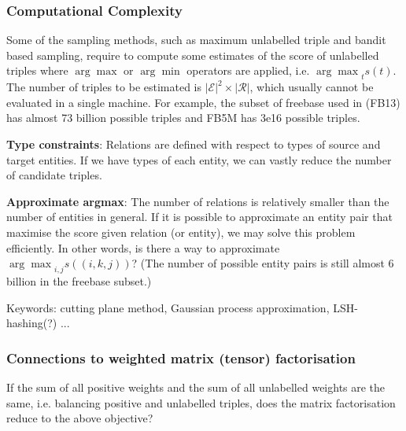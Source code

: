 \documentclass{article}
\theoremstyle{definition}
\begin{document}
\subsubsection{Computational Complexity}
Some of the sampling methods, such as maximum unlabelled triple and bandit based sampling, require to compute some estimates of the score of unlabelled triples where $\arg\max$ or $\arg\min$ operators are applied, i.e. ${\arg\max}_{t}s(t)$. The number of triples to be estimated is $|\mathcal{E}|^2\times|\mathcal{R}|$, which usually cannot be evaluated in a single machine. For example, the subset of freebase used in \cite{gu2015traversing} (FB13) has almost 73 billion possible triples and FB5M has 3e16 possible triples.

\textbf{Type constraints}: Relations are defined with respect to types of source and target entities. If we have types of each entity, we can vastly reduce the number of candidate triples.

\textbf{Approximate argmax}: The number of relations is relatively smaller than the number of entities in general. If it is possible to approximate an entity pair that maximise the score given relation (or entity), we may solve this problem efficiently. In other words, is there a way to approximate ${\arg\max}_{i,j}s((i,k,j))$? (The number of possible entity pairs is still almost 6 billion in the freebase subset.)

Keywords: cutting plane method, Gaussian process approximation, LSH-hashing(?) ...

\subsubsection{Connections to weighted matrix (tensor) factorisation}
If the sum of all positive weights and the sum of all unlabelled weights are the same, i.e. balancing positive and unlabelled triples, does the matrix factorisation reduce to the above objective?



\end{document}
